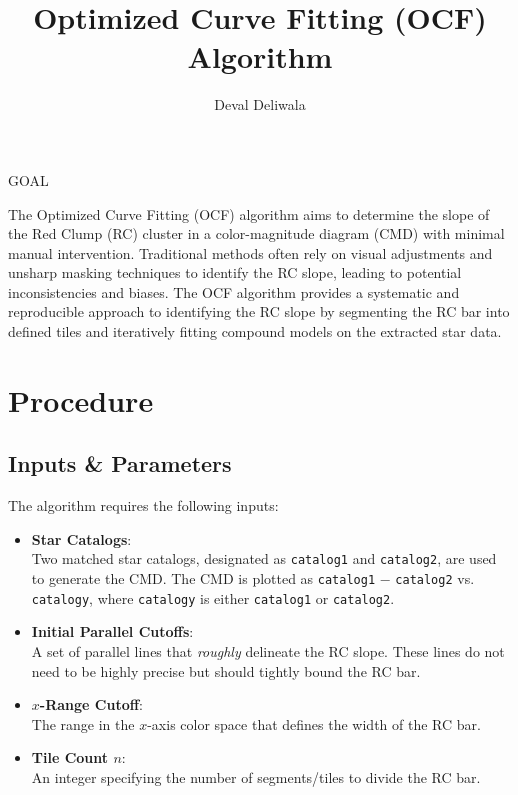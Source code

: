 \documentclass[svgnames]{article}     %
\title{Optimized Curve Fitting (OCF) Algorithm}
\author{Deval Deliwala}
\date{}                              %
\begin{document}
\maketitle

\begin{center}
  GOAL \\ \vspace{5px}
\end{center}

The Optimized Curve Fitting (OCF) algorithm aims to determine the slope of the
Red Clump (RC) cluster in a color-magnitude diagram (CMD) with minimal manual
intervention. Traditional methods often rely on visual adjustments and unsharp
masking techniques to identify the RC slope, leading to potential
inconsistencies and biases. The OCF algorithm provides a systematic and
reproducible approach to identifying the RC slope by segmenting the RC bar into
defined tiles and iteratively fitting compound models on the extracted star data.

\section{Procedure}

\subsection{Inputs \& Parameters}

The algorithm requires the following inputs: 

\begin{itemize}
  \item[1.] \textbf{Star Catalogs}:\\ Two matched star catalogs, designated as
    \verb|catalog1| and \verb|catalog2|, are used to generate the CMD. The CMD
  is plotted as \verb|catalog1| $-$ \verb|catalog2| vs. \verb|catalogy|,
  where \verb|catalogy| is either \verb|catalog1| or \verb|catalog2|. 
\item[2.] \textbf{Initial Parallel Cutoffs}:\\ A set of parallel lines that
  \textit{roughly} delineate the RC slope. These lines do not need to be highly
  precise but should tightly bound the RC bar. 
\item[3.] \textbf{$x$-Range Cutoff}:\\ The range in the $x$-axis color space that
  defines the width of the RC bar. 
\item[4.] \textbf{Tile Count $n$}:\\ An integer specifying the number of
  segments/tiles to divide the RC bar. 
\end{itemize}
\end{document}
